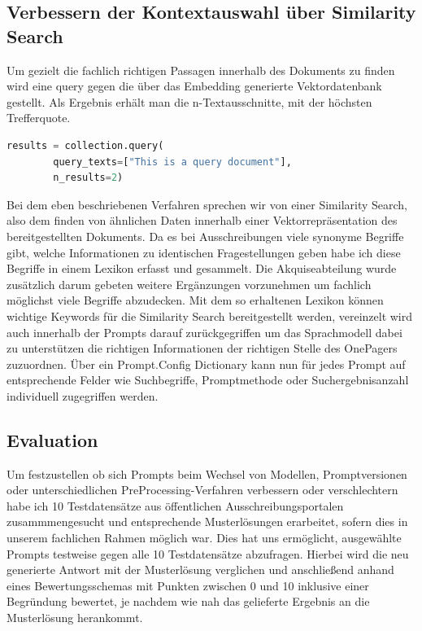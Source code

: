 \subsection{Verbessern der Kontextauswahl über Similarity Search}
\label{chap:Verbessern der Kontextauswahl über Similarity Search}
Um gezielt die fachlich richtigen Passagen innerhalb des Dokuments zu finden wird eine query gegen die über das Embedding generierte Vektordatenbank gestellt.
Als Ergebnis erhält man die n-Textausschnitte, mit der höchsten Trefferquote. 

\begin{lstlisting}[language=Python, caption=Code einer Similarity Search, label=lst:vectorquery_listing]
    results = collection.query(
        query_texts=["This is a query document"],
        n_results=2)
\end{lstlisting}

Bei dem eben beschriebenen Verfahren sprechen wir von einer Similarity Search, also dem finden von ähnlichen Daten innerhalb einer Vektorrepräsentation des 
bereitgestellten Dokuments. Da es bei Ausschreibungen viele synonyme Begriffe gibt, welche Informationen zu identischen Fragestellungen geben habe ich diese 
Begriffe in einem Lexikon erfasst und gesammelt. Die Akquiseabteilung wurde zusätzlich darum gebeten weitere Ergänzungen vorzunehmen um fachlich möglichst 
viele Begriffe abzudecken. Mit dem so erhaltenen Lexikon können wichtige Keywords für die Similarity Search bereitgestellt werden, vereinzelt wird auch innerhalb 
der Prompts darauf zurückgegriffen um das Sprachmodell dabei zu unterstützen die richtigen Informationen der richtigen Stelle des OnePagers zuzuordnen. Über ein 
Prompt.Config Dictionary kann nun für jedes Prompt auf entsprechende Felder wie Suchbegriffe, Promptmethode oder Suchergebnisanzahl individuell zugegriffen werden.

\subsection{Evaluation} 
\label{chap:Evaluation}   
Um festzustellen ob sich Prompts beim Wechsel von Modellen, Promptversionen oder unterschiedlichen PreProcessing-Verfahren verbessern oder verschlechtern 
habe ich 10 Testdatensätze aus öffentlichen Ausschreibungsportalen zusammmengesucht und entsprechende Musterlösungen erarbeitet, sofern dies in unserem 
fachlichen Rahmen möglich war. Dies hat uns ermöglicht, ausgewählte Prompts testweise gegen alle 10 Testdatensätze abzufragen. Hierbei wird die neu 
generierte Antwort mit der Musterlösung verglichen und anschließend anhand eines Bewertungsschemas mit Punkten zwischen 0 und 10 inklusive einer 
Begründung bewertet, je nachdem wie nah das gelieferte Ergebnis an die Musterlösung herankommt.    

